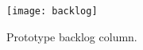 \begin{figure}[hb]
  \texttt{[image: backlog]}
  \caption[Backlog]{Prototype backlog column.}
  \label{fig:backlog}
  \centering
\end{figure}